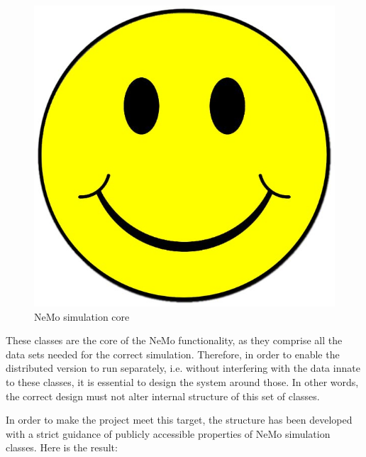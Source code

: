 \begin{figure}[h]
\begin{center}
\includegraphics[scale = 0.1]{images/placeholder.jpg}
\end{center}
\caption{NeMo simulation core}
\end{figure}

These classes are the core of the NeMo functionality, as they comprise all the data sets needed for the correct simulation. Therefore, in order to enable the distributed version to run separately, i.e. without interfering with the data innate to these classes, it is essential to design the system around those. In other words, the correct design must not alter internal structure of this set of classes.

In order to make the project meet this target, the structure has been developed with a strict guidance of publicly accessible properties of NeMo simulation classes. Here is the result:

